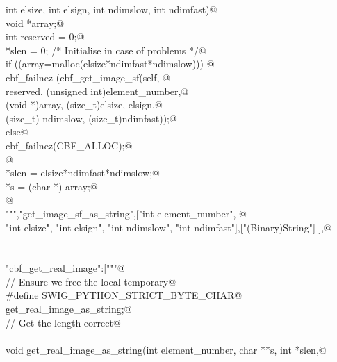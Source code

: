 \documentclass[10pt,a4paper,twoside,notitlepage]{article}
\begin{document}
\begin{flushleft}
\begin{list}{}{}
\mbox{}\verb@    int elsize, int elsign, int ndimslow, int ndimfast){@\\
\mbox{}\verb@        void *array;@\\
\mbox{}\verb@        int reserved = 0;@\\
\mbox{}\verb@        *slen = 0; /* Initialise in case of problems */@\\
\mbox{}\verb@        if ((array=malloc(elsize*ndimfast*ndimslow))) {@\\
\mbox{}\verb@               cbf_failnez (cbf_get_image_sf(self, @\\
\mbox{}\verb@               reserved, (unsigned int)element_number,@\\
\mbox{}\verb@               (void *)array, (size_t)elsize, elsign,@\\
\mbox{}\verb@               (size_t) ndimslow, (size_t)ndimfast));@\\
\mbox{}\verb@         }else{@\\
\mbox{}\verb@               cbf_failnez(CBF_ALLOC);@\\
\mbox{}\verb@         }@\\
\mbox{}\verb@        *slen = elsize*ndimfast*ndimslow;@\\
\mbox{}\verb@        *s = (char *) array;@\\
\mbox{}\verb@      }@\\
\mbox{}\verb@""","get_image_sf_as_string",["int element_number", @\\
\mbox{}\verb@    "int elsize", "int elsign", "int ndimslow", "int ndimfast"],["(Binary)String"] ],@\\
\mbox{}\verb@@\\
\mbox{}\verb@@\\
\mbox{}\verb@"cbf_get_real_image":["""@\\
\mbox{}\verb@// Ensure we free the local temporary@\\
\mbox{}\verb@%{@\\
\mbox{}\verb@#define SWIG_PYTHON_STRICT_BYTE_CHAR@\\
\mbox{}\verb@%}@\\
\mbox{}\verb@%cstring_output_allocate_size(char ** s, int *slen, free(*$1))@\\
\mbox{}\verb@       get_real_image_as_string;@\\
\mbox{}\verb@// Get the length correct@\\
\mbox{}\verb@@\\
\mbox{}\verb@    void get_real_image_as_string(int element_number, char **s, int *slen,@\\

\end{list}
\end{flushleft}
\end{document}
